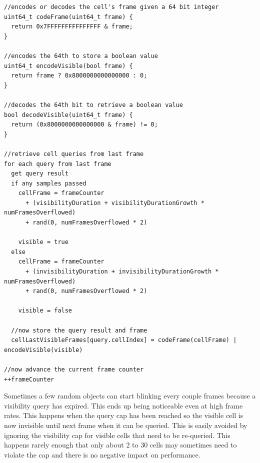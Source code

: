 \documentclass[12pt]{ucthesis}
\begin{document}
\begin{lstlisting}
//encodes or decodes the cell's frame given a 64 bit integer
uint64_t codeFrame(uint64_t frame) {
  return 0x7FFFFFFFFFFFFFFF & frame;
}

//encodes the 64th to store a boolean value
uint64_t encodeVisible(bool frame) {
  return frame ? 0x8000000000000000 : 0;
}

//decodes the 64th bit to retrieve a boolean value
bool decodeVisible(uint64_t frame) {
  return (0x8000000000000000 & frame) != 0;
}

//retrieve cell queries from last frame
for each query from last frame
  get query result
  if any samples passed
    cellFrame = frameCounter 
      + (visibilityDuration + visibilityDurationGrowth * numFramesOverflowed) 
      + rand(0, numFramesOverflowed * 2)

    visible = true
  else
    cellFrame = frameCounter 
      + (invisibilityDuration + invisibilityDurationGrowth * numFramesOverflowed) 
      + rand(0, numFramesOverflowed * 2)
    
    visible = false

  //now store the query result and frame
  cellLastVisibleFrames[query.cellIndex] = codeFrame(cellFrame) | encodeVisible(visible)

//now advance the current frame counter
++frameCounter
\end{lstlisting}

Sometimes a few random objects can start blinking every couple frames because a visibility query has expired.
This ends up being noticeable even at high frame rates.
This happens when the query cap has been reached so the visible cell is now invisible until next frame when it can be queried.
This is easily avoided by ignoring the visibility cap for visible cells that need to be re-queried.
This happens rarely enough that only about 2 to 30 cells may sometimes need to violate the cap and there is no negative impact on performance.
\end{document}
